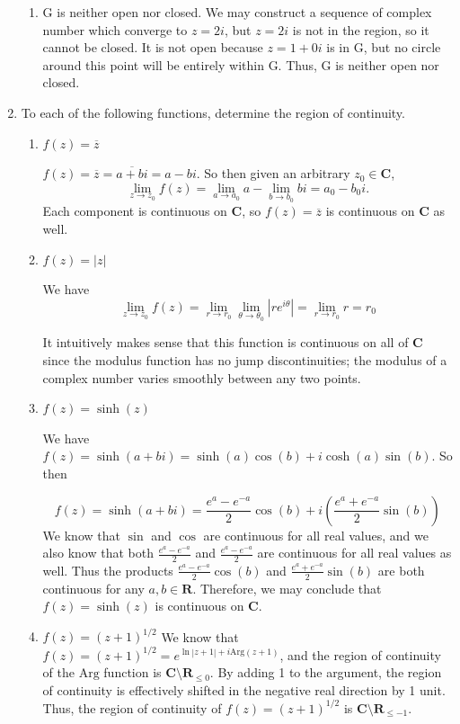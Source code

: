 \documentclass{article}
\newcommand{\R}{\mathbf{R}}
\newcommand{\C}{\mathbf{C}}
\newcommand{\Arg}{\text{Arg}}
\begin{document}
\begin{enumerate}
\begin{enumerate}
			\item G is neither open nor closed. We may construct a sequence of complex number which converge to $z=2i$, but $z=2i$ is not in the region, so it cannot be closed. It is not open because $z=1+0i$ is in G, but no circle around this point will be entirely within G. Thus, G is neither open nor closed.
		\end{enumerate}
		
	\item To each of the following functions, determine the region of continuity. 
		\begin{enumerate}
			\item $f(z)=\overline{z}$
			
			$f(z)=\overline{z}=\overline{a+bi}=a-bi$. So then given an arbitrary $z_0 \in \C$,
		 $$\lim_{z\to z_0}f(z)=\lim_{a\to a_0}a - \lim_{b\to b_0}bi=a_0-b_0 i.$$
		 Each component is continuous on $\C$, so $f(z)=\overline{z}$ is continuous on $\C$ as well.
		 
		 \item $f(z)=|z|$
		 
		 We have 
		 $$\lim_{z\to z_0}f(z)=\lim_{r\to r_0}\lim_{\theta \to \theta_0}|re^{i\theta}|=\lim_{r\to r_0}r = r_0$$
		 
		 It intuitively makes sense that this function is continuous on all of $\C$ since the modulus function has no jump discontinuities; the modulus of a complex number varies smoothly between any two points.
		 
		 \item $f(z)=\sinh(z)$
		 
		 We have $f(z)=\sinh(a+bi)=\sinh(a)\cos(b)+i\cosh(a)\sin(b) $. So then
		 
		 $$f(z)=\sinh(a+bi)=\frac{e^a-e^{-a}}{2}\cos(b)+i\left(\frac{e^a+e^{-a}}{2}\sin(b)\right) $$
		 We know that $\sin$ and $\cos$ are continuous for all real values, and we also know that both $\frac{e^a-e^{-a}}{2}$ and $\frac{e^a-e^{-a}}{2}$ are continuous for all real values as well. Thus the products $\frac{e^a-e^{-a}}{2}\cos(b)$ and $\frac{e^a+e^{-a}}{2}\sin(b) $ are both continuous for any $a,b\in \R$. Therefore, we may conclude that $f(z)=\sinh(z)$ is continuous on $\C$.
		 \item $f(z)=(z+1)^{1/2}$
		 We know that $f(z)=(z+1)^{1/2}=e^{\ln|z+1|+i\Arg(z+1)}$, and the region of continuity of the $\Arg$ function is $\C\setminus \R_{\leqslant 0}$. By adding 1 to the argument, the region of continuity is effectively shifted in the negative real direction by 1 unit. Thus, the region of continuity of $f(z)=(z+1)^{1/2}$ is $\C\setminus\R_{\leqslant -1}$.
		 

\end{enumerate}
\end{enumerate}
\end{document}
